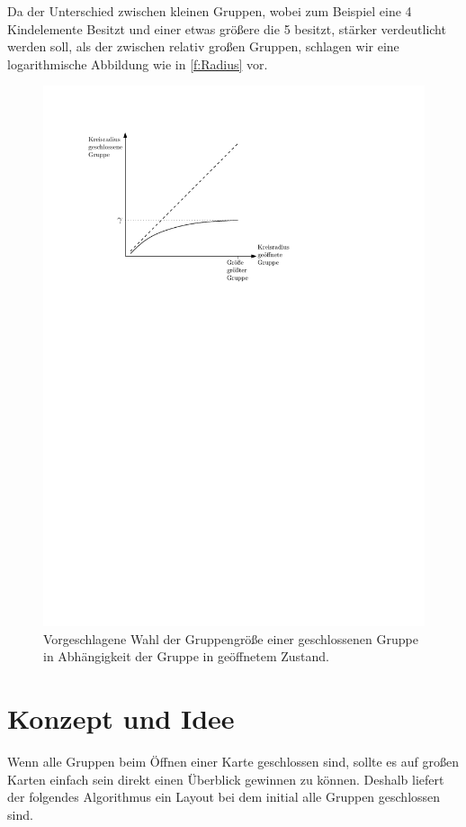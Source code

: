 Da der Unterschied zwischen kleinen Gruppen, wobei zum Beispiel eine 4 Kindelemente Besitzt und einer etwas größere die 5 besitzt, stärker verdeutlicht werden soll, als der zwischen 
relativ großen Gruppen, schlagen wir eine logarithmische Abbildung wie in \autoref{f:Radius} vor.
\begin{figure}[h!]
\begin{center} 
\includegraphics{Pics/Radius.pdf}
  \caption{Vorgeschlagene Wahl der Gruppengröße einer geschlossenen Gruppe in Abhängigkeit der Gruppe in geöffnetem Zustand. }
  \label{f:Radius}
\end{center}
\end{figure}


\section{Konzept und Idee}
\label{sec:Algo}
Wenn alle Gruppen beim Öffnen einer Karte geschlossen sind, sollte es auf großen Karten einfach sein direkt einen Überblick gewinnen zu können.
Deshalb liefert der folgendes Algorithmus ein Layout bei dem initial alle Gruppen geschlossen sind.


